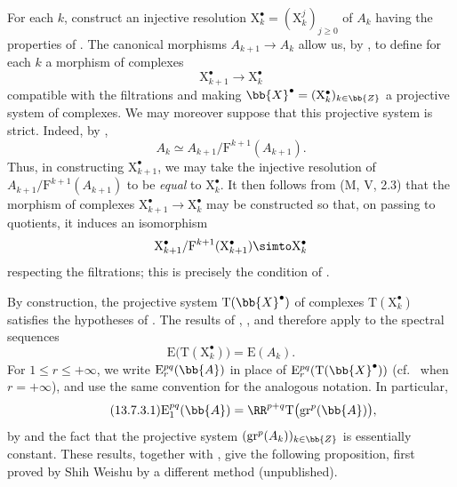 \begin{env}[13.7.2]
\label{0.13.7.2}
For each $k$, construct an injective resolution
$\mathrm{X}_k^\bullet=(\mathrm{X}_k^j)_{j\geq0}$ of $A_k$ having the
properties of .
The canonical morphisms $A_{k+1}\longrightarrow A_k$ allow us, by
, to define for each $k$ a morphism of complexes
\[
  \mathrm{X}_{k+1}^\bullet\longrightarrow\mathrm{X}_k^\bullet
\]
compatible with the filtrations and making
$\bb{X}^\bullet=(\mathrm{X}_k^\bullet)_{k\in\bb{Z}}$ a projective
system of complexes.
We may moreover suppose that this projective system is strict.
Indeed, by ,
\[
  A_k
  \simeq
  A_{k+1}/\mathrm{F}^{k+1}(A_{k+1}).
\]
Thus, in constructing $\mathrm{X}_{k+1}^\bullet$, we may take the
injective resolution of
$A_{k+1}/\mathrm{F}^{k+1}(A_{k+1})$ to be
\emph{equal} to $\mathrm{X}_k^\bullet$.
It then follows from (M, V, 2.3) that the morphism of complexes
$\mathrm{X}_{k+1}^\bullet\longrightarrow\mathrm{X}_k^\bullet$ may be
constructed so that, on passing to quotients, it induces an
isomorphism
\[
  \mathrm{X}_{k+1}^\bullet/
  \mathrm{F}^{k+1}(\mathrm{X}_{k+1}^\bullet)
  \simto
  \mathrm{X}_k^\bullet
\]
respecting the filtrations; this is precisely the condition of
.
\end{env}

\begin{env}[13.7.3]
\label{0.13.7.3}
By construction, the projective system
$\mathrm{T}(\bb{X}^\bullet)$ of complexes
$\mathrm{T}(\mathrm{X}_k^\bullet)$ satisfies the hypotheses of
.
The results of , , and
 therefore apply to the spectral sequences
\[
  \mathrm{E}\bigl(\mathrm{T}(\mathrm{X}_k^\bullet)\bigr)
  =
  \mathrm{E}(A_k).
\]
For $1\leq r\leq+\infty$, we write
$\mathrm{E}_r^{pq}(\bb{A})$ in place of
$\mathrm{E}_r^{pq}(\mathrm{T}(\bb{X}^\bullet))$
(cf.\  when $r=+\infty$), and use the same convention
for the analogous notation.
In particular,
\begin{equation}
\label{0.13.7.3.1}
\tag{13.7.3.1}
  \mathrm{E}_1^{pq}(\bb{A})
  =
  \RR^{p+q}\mathrm{T}\bigl(\mathrm{gr}^p(\bb{A})\bigr),
\end{equation}
by  and the fact that the projective system
$(\mathrm{gr}^p(A_k))_{k\in\bb{Z}}$ is essentially constant.
These results, together with , give the following
proposition, first proved by Shih Weishu by a different method
(unpublished).
\end{env}

